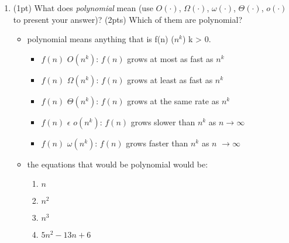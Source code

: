 \documentclass{article}[12pt]
\newcommand\encircle[1]{\raisebox{.5pt}{\textcircled{\raisebox{-.9pt} {\footnotesize #1}}} }
\begin{document}
\begin{enumerate}[label=(\arabic*)]
  \item (1pt) What does \emph{polynomial} mean (use $O(\cdot)$, $\Omega(\cdot)$, $\omega(\cdot)$, $\Theta(\cdot)$, $o(\cdot)$ to present your answer)? (2pts) Which of them are polynomial?
    \begin{itemize}
      \item polynomial means anything that is f(n) \epsilon  \Theta($n^k$) k > 0.
        \begin{itemize}
          \item $f(n)$ \epsilon $O(n^k)$: $f(n)$ grows at most as fast as $n^k$
          \item $f(n)$ \epsilon $\Omega(n^k)$: $f(n)$ grows at least as fast as $n^k$
          \item $f(n)$ \epsilon $\Theta(n^k)$: $f(n)$ grows at the same rate as $n^k$
          \item $f(n)$ $\epsilon$  $o(n^k)$: $f(n)$ grows slower than $n^k$ as $n \rightarrow \infty$
          \item $f(n)$ \epsilon $\omega(n^k)$: $f(n)$ grows faster than $n^k$ as $n$ $\rightarrow \infty$
        \end{itemize}
      \item the equations that would be polynomial would be:
\begin{center}
\begin{multicols}{4}
\begin{enumerate}[label=\encircle{\arabic*}]
  \item $n$
  \item $n^2$
  \item $n^3$
  \item $5n^2-13n+6$
\end{enumerate}
\end{multicols}
\end{center}
    \end{itemize}


\end{enumerate}
\end{document}
